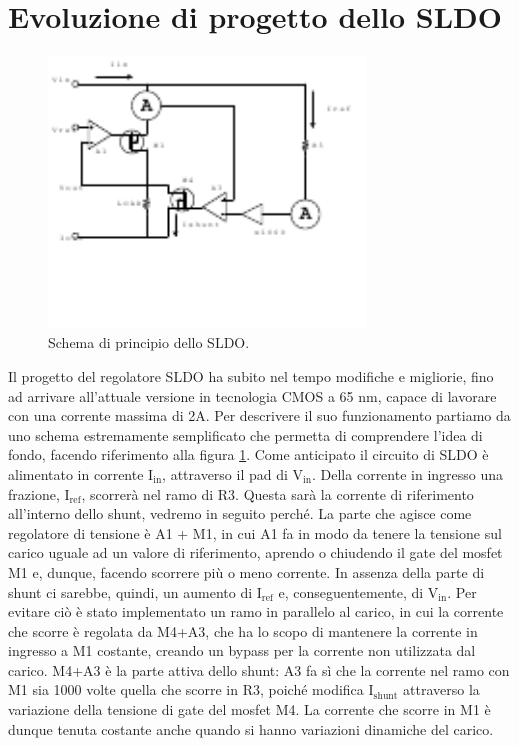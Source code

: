 \section{Evoluzione di progetto dello SLDO}

\begin{figure}[!htbp]
\centering
\includegraphics[width=0.75\textwidth]{Immagini/SLDObase}
\caption{Schema di principio dello SLDO.}
\label{SLDOprova}
\end{figure}

Il progetto del regolatore SLDO ha subito nel tempo modifiche e migliorie, fino ad arrivare all'attuale versione in tecnologia CMOS a 65 nm, capace di lavorare con una corrente massima di 2A.
Per descrivere il suo funzionamento partiamo da uno schema estremamente semplificato che permetta di comprendere l'idea di fondo, facendo riferimento alla figura \ref{SLDOprova}. 
Come anticipato il circuito di SLDO è alimentato in corrente $\mathrm{I_{in}}$, attraverso il pad di $\mathrm{V_{in}}$. 
Della corrente in ingresso una frazione, $\mathrm{I_{ref}}$, scorrerà nel ramo di R3.
Questa sarà la corrente di riferimento all'interno dello shunt, vedremo in seguito perché. 
La parte che agisce come regolatore di tensione è A1 + M1, in cui A1 fa in modo da tenere la tensione sul carico uguale ad un valore di riferimento, aprendo o chiudendo il gate del mosfet M1 e, dunque, facendo scorrere più o meno corrente. 
In assenza della parte di shunt ci sarebbe, quindi, un aumento di $\mathrm{I_{ref}}$ e, conseguentemente, di $\mathrm{V_{in}}$. 
Per evitare ciò è stato implementato un ramo in parallelo al carico, in cui la corrente che scorre è regolata da M4+A3, che ha lo scopo di mantenere la corrente in ingresso a M1 costante, creando un bypass per la corrente non utilizzata dal carico. 
M4+A3 è la parte attiva dello shunt: A3 fa sì che la corrente nel ramo con M1 sia 1000 volte quella che scorre in R3, poiché modifica $\mathrm{I_{shunt}}$ attraverso la variazione della tensione di gate del mosfet M4.
La corrente che scorre in M1 è dunque tenuta costante anche quando si hanno variazioni dinamiche del carico.

